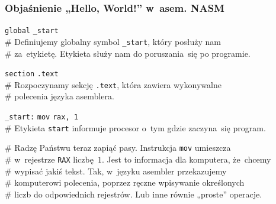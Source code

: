 \documentclass[10pt,t]{beamer}
\begin{document}
\begin{frame}
  \frametitle{Objaśnienie „Hello, World!” w~asem. NASM
    \parencite{Toal-NASM-Tutorial-Ver-2024}}


  \hphantom{aaaaaaaaa} \texttt{global} \hphantom{aa} \texttt{\_start} \\
  \# Definiujemy globalny symbol \texttt{\_start}, który posłuży nam \\
  \# za~etykietę. Etykieta służy nam do poruszania~się po programie.

  \hphantom{aaaaaaaaa} \texttt{section} \hphantom{a} \texttt{.text} \\
  \# Rozpoczynamy sekcję \texttt{.text}, która zawiera wykonywalne \\
  \# polecenia języka asemblera.


  \texttt{\_start:} \hphantom{a} \hspace{-0.14em}
  \texttt{mov} \hphantom{aaaaaa} \texttt{rax, 1} \\
  \# Etykieta \texttt{start} informuje procesor o~tym gdzie zaczyna~się
  program.

  \# \alert{Radzę Państwu teraz zapiąć pasy.} Instrukcja \texttt{mov}
  umieszcza \\
  \# w~rejestrze \texttt{RAX} liczbę~$1$. Jest to informacja dla komputera,
  że~chcemy \\
  \# wypisać jakiś tekst. Tak, w~języku asembler przekazujemy \\
  \# komputerowi polecenia, poprzez ręczne wpisywanie określonych \\
  \# liczb do odpowiednich rejestrów. Lub inne równie „proste” operacje.

\end{frame}
\end{document}
